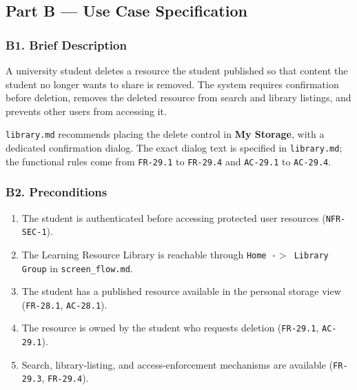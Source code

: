 \documentclass[12pt]{article}
\begin{document}
\subsection*{Part B --- Use Case Specification}
\par\medskip

\hypertarget{sec:b1-brief-description}{}
\subsubsection*{B1. Brief Description}
\par\medskip

A university student deletes a resource the student published so that content the student no longer wants to share is removed. The system requires confirmation before deletion, removes the deleted resource from search and library listings, and prevents other users from accessing it.
\par\medskip

\texttt{library.md} recommends placing the delete control in \textbf{My Storage}, with a dedicated confirmation dialog. The exact dialog text is specified in \texttt{library.md}; the functional rules come from \texttt{FR-29.1} to \texttt{FR-29.4} and \texttt{AC-29.1} to \texttt{AC-29.4}.
\par\medskip

\hypertarget{sec:b2-preconditions}{}
\subsubsection*{B2. Preconditions}
\par\medskip

\begin{enumerate}
\item The student is authenticated before accessing protected user resources (\texttt{NFR-SEC-1}).
\item The Learning Resource Library is reachable through \texttt{Home -$>$ Library Group} in \texttt{screen\_flow.md}.
\item The student has a published resource available in the personal storage view (\texttt{FR-28.1}, \texttt{AC-28.1}).
\item The resource is owned by the student who requests deletion (\texttt{FR-29.1}, \texttt{AC-29.1}).
\item Search, library-listing, and access-enforcement mechanisms are available (\texttt{FR-29.3}, \texttt{FR-29.4}).
\end{enumerate}
\par\medskip
\end{document}
